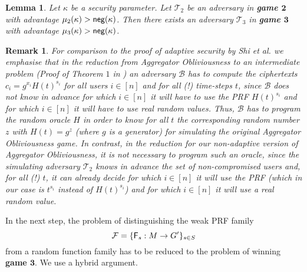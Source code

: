 \documentclass[10pt]{extarticle}
\newtheorem{Lem}[Thm]{Lemma}
\newtheorem{Rem}{Remark}
\begin{document}
\begin{Lem}\label{gametwothree} Let $\kappa$ be a security parameter. Let $\mathcal{T}_2$ be an adversary in \textbf{\upshape game $\boldsymbol 2$} with advantage $\mu_{2}(\kappa)>\text{\upshape\sffamily neg}(\kappa)$. Then there exists an adversary $\mathcal{T}_3$ in \textbf{\upshape game $\boldsymbol 3$} with advantage $\mu_{3}(\kappa)>\text{\upshape\sffamily neg}(\kappa)$.
\end{Lem}

\begin{Rem} For comparison to the proof of adaptive security by Shi et al.  we emphasise that in the reduction from Aggregator Obliviousness to an intermediate problem (Proof of Theorem $1$ in ) an adversary $\mathcal{B}$ has to compute the ciphertexts $c_i=g^{x_i}H(t)^{s_i}$ for all users $i\in[n]$ and for all (!) time-steps $t$, since $\mathcal{B}$ does not know in advance for which $i\in[n]$ it will have to use the PRF $H(t)^{s_i}$ and for which $i\in[n]$ it will have to use real random values. Thus, $\mathcal{B}$ has to program the random oracle $H$ in order to know for all $t$ the corresponding random number $z$ with $H(t)=g^z$ (where $g$ is a generator) for simulating the original Aggregator Obliviousness game. In contrast, in the reduction for our non-adaptive version of Aggregator Obliviousness, it is not necessary to program such an oracle, since the simulating adversary $\mathcal{T}_2$ knows in advance the set of non-compromised users and, for all (!) $t$, it can already decide for which $i\in[n]$ it will use the PRF (which in our case is $t^{s_i}$ instead of $H(t)^{s_i}$) and for which $i\in[n]$ it will use a real random value.
\end{Rem}


\noindent In the next step, the problem of distinguishing the weak PRF family 
\[\mathcal{F}=\{\text{\upshape\sffamily F}_s:M\to G^\prime\}_{s\in S}\] 
from a random function family has to be reduced to the problem of winning \textbf{\upshape game $\boldsymbol 3$}. We use a hybrid argument.
\end{document}
